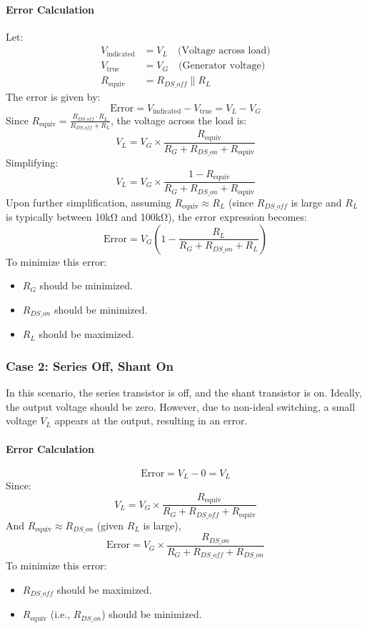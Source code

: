 \paragraph{Error Calculation}
Let:
\begin{align*}
V_{\text{indicated}} &= V_L \quad \text{(Voltage across load)} \\
V_{\text{true}} &= V_G \quad \text{(Generator voltage)} \\
R_{\text{equiv}} &= R_{DS\_off} \parallel R_L
\end{align*}
The error is given by:
\[
\text{Error} = V_{\text{indicated}} - V_{\text{true}} = V_L - V_G
\]
Since \( R_{\text{equiv}} = \frac{R_{DS\_off} \cdot R_L}{R_{DS\_off} + R_L} \), the voltage across the load is:
\[
V_L = V_G \times \frac{R_{\text{equiv}}}{R_G + R_{DS\_on} + R_{\text{equiv}}}
\]
Simplifying:
\[
V_L = V_G \times \frac{1 - R_{\text{equiv}}}{R_G + R_{DS\_on} + R_{\text{equiv}}}
\]
Upon further simplification, assuming \( R_{\text{equiv}} \approx R_L \) (since \( R_{DS\_off} \) is large and \( R_L \) is typically between 10kΩ and 100kΩ), the error expression becomes:
\[
\text{Error} = V_G \left(1 - \frac{R_L}{R_G + R_{DS\_on} + R_L}\right)
\]
To minimize this error:
\begin{itemize}
    \item \( R_G \) should be minimized.
    \item \( R_{DS\_on} \) should be minimized.
    \item \( R_L \) should be maximized.
\end{itemize}

\subsubsection{Case 2: Series Off, Shant On}
In this scenario, the series transistor is off, and the shant transistor is on. Ideally, the output voltage should be zero. However, due to non-ideal switching, a small voltage \( V_L \) appears at the output, resulting in an error.

\paragraph{Error Calculation}
\[
\text{Error} = V_L - 0 = V_L
\]
Since:
\[
V_L = V_G \times \frac{R_{\text{equiv}}}{R_G + R_{DS\_off} + R_{\text{equiv}}}
\]
And \( R_{\text{equiv}} \approx R_{DS\_on} \) (given \( R_L \) is large),
\[
\text{Error} = V_G \times \frac{R_{DS\_on}}{R_G + R_{DS\_off} + R_{DS\_on}}
\]
To minimize this error:
\begin{itemize}
    \item \( R_{DS\_off} \) should be maximized.
    \item \( R_{\text{equiv}} \) (i.e., \( R_{DS\_on} \)) should be minimized.
\end{itemize}

